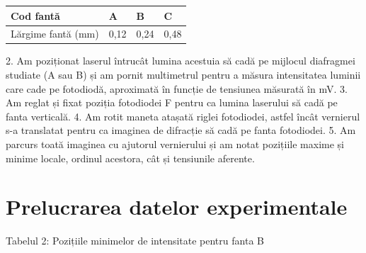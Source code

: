 \documentclass{article}
\begin{document}
\begin{table}[H]
    \begin{tabular}{|l|l|l|l|}
    \hline
    Cod fantă          & A    & B    & C    \\ \hline
    Lărgime fantă (mm) & 0,12 & 0,24 & 0,48 \\ \hline
    \end{tabular}
    \end{table}

\makebox[1cm]{} 2. Am poziționat laserul întrucât lumina acestuia să cadă pe mijlocul diafragmei studiate (A sau B) și am pornit multimetrul pentru a măsura intensitatea luminii care cade pe fotodiodă, aproximată în funcție de tensiunea măsurată în mV. \newline
\makebox[1.5cm]{} 3. Am reglat și fixat poziția fotodiodei F pentru ca lumina laserului să cadă pe fanta verticală. \newline
\makebox[1.5cm]{} 4. Am rotit maneta atașată riglei fotodiodei, astfel încât vernierul s-a translatat pentru ca imaginea de difracție să cadă pe fanta fotodiodei. \newline
\makebox[1.5cm]{} 5. Am parcurs toată imaginea cu ajutorul vernierului și am notat pozițiile maxime și minime locale, ordinul acestora, cât și tensiunile aferente. \newline

\section        {Prelucrarea datelor experimentale}

\makebox[-0.7cm]{} Tabelul 2: Pozițiile minimelor de intensitate pentru fanta B
\end{document}
